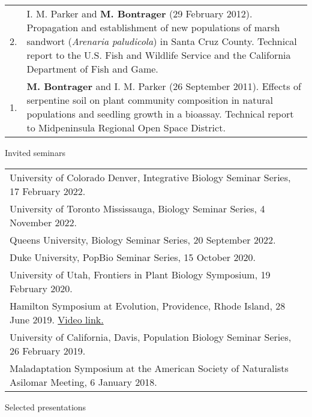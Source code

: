 \documentclass[letterpaper,11pt,oneside]{article}
\begin{document}
\def\arraystretch{1.4}
\noindent \begin{tabular}{@{} p{0.5cm} >{\raggedright\arraybackslash}p{16.7cm}}
2. & I. M. Parker and \textbf{M. Bontrager} (29 February 2012). Propagation and establishment of new populations of marsh sandwort (\textit{Arenaria paludicola}) in Santa Cruz County. Technical report to the U.S. Fish and Wildlife Service and the California Department of Fish and Game. \\
1. & \textbf{M. Bontrager} and I. M. Parker (26 September 2011). Effects of serpentine soil on plant community composition in natural populations and seedling growth in a bioassay. Technical report to Midpeninsula Regional Open Space District. \\
\end{tabular}

\bigskip




\noindent\Large{Invited seminars} 

\normalsize
\medskip

\def\arraystretch{1.3}
\noindent \begin{tabular}{@{} >{\raggedright\arraybackslash}p{17.2cm}}

University of Colorado Denver, Integrative Biology Seminar Series, 17 February 2022.\\
University of Toronto Mississauga, Biology Seminar Series, 4 November 2022.\\ 
Queens University, Biology Seminar Series, 20 September 2022.\\
Duke University, PopBio Seminar Series, 15 October 2020.\\
University of Utah, Frontiers in Plant Biology Symposium, 19 February 2020.\\
Hamilton Symposium at Evolution, Providence, Rhode Island, 28 June 2019. \href{https://www.youtube.com/watch?v=UeK_zYEfVyA}{Video link.} \\
University of California, Davis, Population Biology Seminar Series, 26 February 2019. \\
Maladaptation Symposium at the American Society of Naturalists Asilomar Meeting, 6 January 2018.
\end{tabular}
\bigskip





\noindent\Large{Selected presentations}  
\normalsize
\medskip
\end{document}

